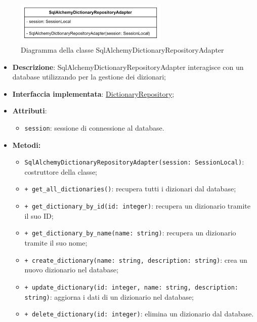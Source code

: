  \label{SqlAlchemyDictionaryRepositoryAdapter}
\begin{figure}[H]
    \centering
    \includegraphics[width=0.65\textwidth]{assets/Backend/sql_alchemy_dictionary_repository_adapter.png}
    \caption{Diagramma della classe SqlAlchemyDictionaryRepositoryAdapter}
  \end{figure}
\begin{itemize}
    \item \textbf{Descrizione}: SqlAlchemyDictionaryRepositoryAdapter interagisce con un database utilizzando  per la gestione dei dizionari;
    \item \textbf{Interfaccia implementata}: \hyperref[DictionaryRepository]{DictionaryRepository};
    \item \textbf{Attributi}:
    \begin{itemize}
        \item \texttt{session}: sessione di connessione al database.
    \end{itemize}
    \item \textbf{Metodi:}
    \begin{itemize}
        \item \texttt{SqlAlchemyDictionaryRepositoryAdapter(session: SessionLocal)}: costruttore della classe;
        \item \texttt{+ get\_all\_dictionaries()}: recupera tutti i dizionari dal database;
        \item \texttt{+ get\_dictionary\_by\_id(id: integer)}: recupera un dizionario tramite il suo ID;
        \item \texttt{+ get\_dictionary\_by\_name(name: string)}: recupera un dizionario tramite il suo nome;
        \item \texttt{+ create\_dictionary(name: string, description: string)}: crea un nuovo dizionario nel database;
        \item \texttt{+ update\_dictionary(id: integer, name: string, description: string)}: aggiorna i dati di un dizionario nel database;
        \item \texttt{+ delete\_dictionary(id: integer)}: elimina un dizionario dal database.
    \end{itemize}
\end{itemize} 

